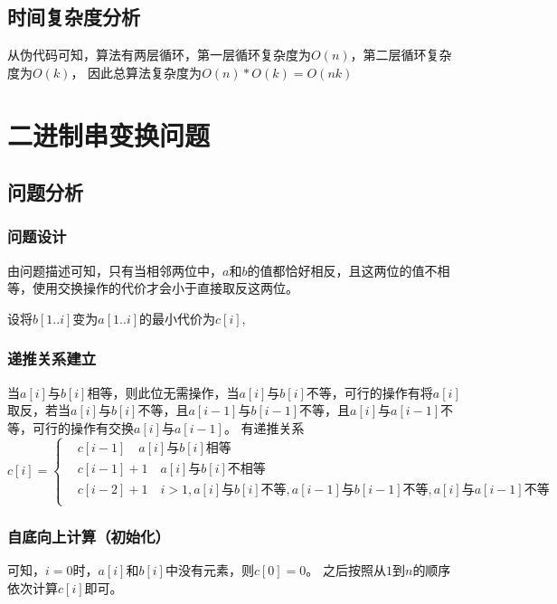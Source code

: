 \subsection{时间复杂度分析}

从伪代码可知，算法有两层循环，第一层循环复杂度为$O(n)$，第二层循环复杂度为$O(k)$， 因此总算法复杂度为$O(n) * O(k) = O(nk)$

\section{二进制串变换问题}

\subsection*{问题分析}
\subsubsection{问题设计}
由问题描述可知，只有当相邻两位中，$a$和$b$的值都恰好相反，且这两位的值不相等，使用交换操作的代价才会小于直接取反这两位。

设将$b[1..i]$变为$a[1..i]$的最小代价为$c[i]$,
\subsubsection{递推关系建立}
当$a[i]$与$b[i]$相等，则此位无需操作，当$a[i]$与$b[i]$不等，可行的操作有将$a[i]$取反，若当$a[i]$与$b[i]$不等，且$a[i-1]$与$b[i-1]$不等，且$a[i]$与$a[i-1]$不等，可行的操作有交换$a[i]$与$a[i-1]$。
有递推关系
\begin{equation}
    c[i]= 
    \left \{
    \begin{align}
        &c[i-1] \quad a[i]\text{与}b[i]\text{相等} \\
        &c[i-1]+1 \quad a[i]\text{与}b[i]\text{不相等} \\
        &c[i-2]+1 \quad i>1, a[i]\text{与}b[i]\text{不等},a[i-1]\text{与}b[i-1]\text{不等},a[i]\text{与}a[i-1]\text{不等}\\
    \end{align}
    \right .
\end{equation}

\subsubsection{自底向上计算（初始化）}

可知，$i = 0$时，$a[i]$和$b[i]$中没有元素，则$c[0] = 0$。
之后按照从$1$到$n$的顺序依次计算$c[i]$即可。

